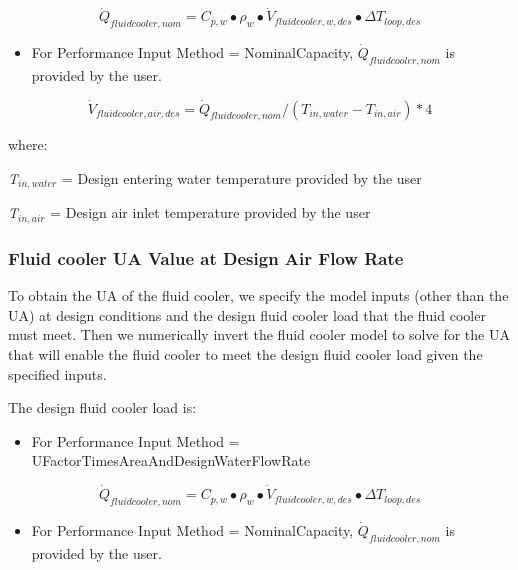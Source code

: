 \begin{equation}
{\dot Q_{fluidcooler,nom}} = {C_{p,w}} \bullet {\rho_w} \bullet {\dot V_{fluidcooler,w,des}} \bullet \Delta {T_{loop,des}}
\end{equation}

\begin{itemize}
\tightlist
\item
  For Performance Input Method = NominalCapacity, \({\dot Q_{fluidcooler,nom}}\) is provided by the user.
\end{itemize}

\begin{equation}
{\dot V_{fluidcooler,air,des}} = {\dot Q_{fluidcooler,nom}}/({T_{in,water}} - {T_{in,air}})*4
\end{equation}

where:

\emph{T\(_{in,water}\)} = Design entering water temperature provided by the user

\emph{T\(_{in,air}\)} = Design air inlet temperature provided by the user

\subsubsection{Fluid cooler UA Value at Design Air Flow Rate}\label{fluid-cooler-ua-value-at-design-air-flow-rate}

To obtain the UA of the fluid cooler, we specify the model inputs (other than the UA) at design conditions and the design fluid cooler load that the fluid cooler must meet. Then we numerically invert the fluid cooler model to solve for the UA that will enable the fluid cooler to meet the design fluid cooler load given the specified inputs.

The design fluid cooler load is:

\begin{itemize}
\tightlist
\item
  For Performance Input Method = UFactorTimesAreaAndDesignWaterFlowRate
\end{itemize}

\begin{equation}
{\dot Q_{fluidcooler,nom}} = {C_{p,w}} \bullet {\rho_w} \bullet {\dot V_{fluidcooler,w,des}} \bullet \Delta {T_{loop,des}}
\end{equation}

\begin{itemize}
\tightlist
\item
  For Performance Input Method = NominalCapacity, \({\dot Q_{fluidcooler,nom}}\) is provided by the user.
\end{itemize}

